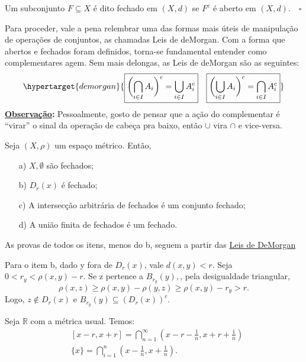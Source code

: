 \documentclass[metric_notes.tex]{subfiles}
\begin{document}
\begin{def*}
	Um subconjunto \(F\subseteq{X}\) é dito fechado em \((X, d)\) se \(F^{c}\) é aberto em \((X, d).\quad\square\)
\end{def*}
Para proceder, vale a pena relembrar uma das formas mais úteis de manipulação de operações de conjuntos, as chamadas Leis de deMorgan. Com a forma que abertos e fechados foram definidos,
torna-se fundamental entender como complementares agem. Sem mais delongas, as Leis de deMorgan são as seguintes:
\[
	\hypertarget{demorgan}{\boxed{\biggl(\bigcap_{i\in I}^{}{A_{i}}\biggr)^{c} = \bigcup_{i\in I}^{}{A_{i}^{c}}}\quad\boxed{\biggl(\bigcup_{i\in I}^{}{A_{i}}\biggr)^{c} = \bigcap_{i\in I}^{}{A_{i}^{c}}}}
\]
\textbf{\underline{Observação}:} Pessoalmente, gosto de pensar que a ação do complementar é ``virar'' o sinal da operação de cabeça pra baixo, então \(\cup\) vira \(\cap\) e vice-versa.
\begin{prop*}
	Seja \((X, \rho )\) um espaço métrico. Então,
	\begin{itemize}
		\item[a)] \(X, \emptyset\) são fechados;
		\item[b)] \(D_{r}(x)\) é fechado;
		\item[c)] A intersecção arbitrária de fechados é um conjunto fechado;
		\item[d)] A união finita de fechados é um fechado.
	\end{itemize}
\end{prop*}
\begin{proof*}
	As provas de todos os itens, menos do b, seguem a partir das \hyperlink{demorgan}{Leis de DeMorgan}

	Para o item b, dado y fora de \(D_{r}(x)\), vale \(d(x, y) < r.\) Seja \(0 < r_{y} < \rho (x, y) - r.\) Se z pertence a \(B_{r_{y}}(y),\), pela desigualdade triangular,
	\[
		\rho (x, z)\geq \rho (x, y) - \rho (y, z)\geq \rho (x, y) - r_{y} > r.
	\]
	Logo, \(z\not\in D_{r}(x)\) e \(B_{r_{y}}(y)\subseteq{(D_{r}(x))^{c}}.\) \qedsymbol
\end{proof*}
\begin{example}
	Seja \(\mathbb{R}\) com a métrica usual. Temos:
	\begin{align*}
		 & [x-r, x+r]=\bigcap_{n=1}^{\infty}{(x-r-\frac{1}{n}, x+r+\frac{1}{n})} \\
		 & \{x\} = \bigcap_{i=1}^{n}{(x-\frac{1}{n}, x+\frac{1}{n})}.
	\end{align*}
\end{example}
\end{document}
